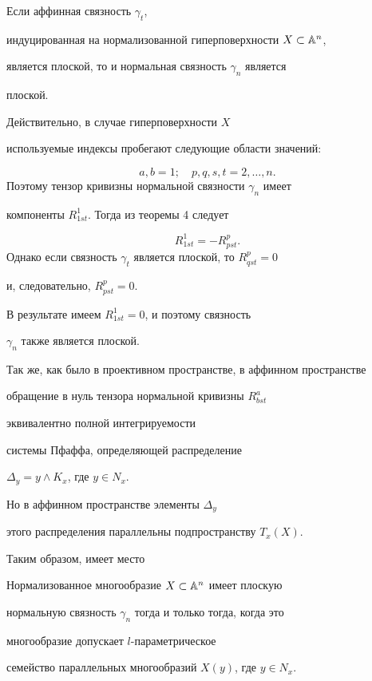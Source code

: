 \begin{thm} Если аффинная связность $\gamma_t$,


индуцированная на нормализованной гиперповерхности $X \subset \Bbb{A}^n$,


является плоской, то и нормальная связность $\gamma_n$ является


плоской.


\end{thm}



\begin{pf} Действительно, в случае гиперповерхности $X$


используемые индексы пробегают следующие области значений:


$$


a, b = 1;\quad p, q, s, t = 2, \dotsc, n.


$$
Поэтому тензор кривизны нормальной связности $\gamma_n$ имеет


компоненты $R^1_{1st}$. Тогда из теоремы 4 следует


$$


R^1_{1st} = - R^p_{pst}.


$$
Однако если связность $\gamma_t$ является плоской, то $R^p_{qst} = 0$


и, следовательно, $R^p_{pst} = 0$.


 В результате имеем $R^1_{1st} = 0$, и поэтому связность


$\gamma_n$ также является плоской.


\end{pf}



Так же, как было в проективном пространстве, в аффинном пространстве


обращение в нуль тензора нормальной кривизны $R^a_{bst}$


эквивалентно полной интегрируемости


системы Пфаффа, определяющей распределение


$\Delta_y = y \wedge K_x$, где $y \in N_x$.


 Но в аффинном пространстве элементы $\Delta_y$


этого распределения параллельны подпространству $T_x (X)$.



Таким образом, имеет место 



\begin{thm}
 Нормализованное многообразие $X \subset \Bbb{A}^n$ имеет плоскую


нормальную связность $\gamma_n$ тогда и только тогда, когда это


многообразие допускает $l$-параметрическое


семейство параллельных многообразий $X (y)$, где $y \in N_x$.


\end{thm}






